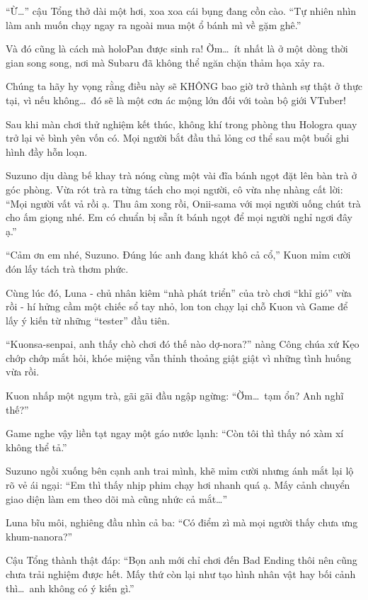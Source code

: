 \documentclass[../main.tex]{subfiles}
\begin{document}
``Ừ\dots'' cậu Tổng thở dài một hơi, xoa xoa cái bụng đang cồn cào. ``Tự nhiên nhìn làm anh muốn chạy ngay ra ngoài mua một ổ bánh mì về gặm ghê.''

Và đó cũng là cách mà holoPan được sinh ra! Ờm\dots\ ít nhất là ở một dòng thời gian song song, nơi mà Subaru đã không thể ngăn chặn thảm họa xảy ra.

Chúng ta hãy hy vọng rằng điều này sẽ KHÔNG bao giờ trở thành sự thật ở thực tại, vì nếu không\dots\ đó sẽ là một cơn ác mộng lớn đối với toàn bộ giới VTuber!

\omk

Sau khi màn chơi thử nghiệm kết thúc, không khí trong phòng thu Hologra quay trở lại vẻ bình yên vốn có. Mọi người bắt đầu thả lỏng cơ thể sau một buổi ghi hình đầy hỗn loạn.

Suzuno dịu dàng bế khay trà nóng cùng một vài đĩa bánh ngọt đặt lên bàn trà ở góc phòng. Vừa rót trà ra từng tách cho mọi người, cô vừa nhẹ nhàng cất lời: ``Mọi người vất vả rồi ạ. Thu âm xong rồi, Onii-sama với mọi người uống chút trà cho ấm giọng nhé. Em có chuẩn bị sẵn ít bánh ngọt để mọi người nghỉ ngơi đây ạ.''

``Cảm ơn em nhé, Suzuno. Đúng lúc anh đang khát khô cả cổ,'' Kuon mỉm cười đón lấy tách trà thơm phức.

Cùng lúc đó, Luna - chủ nhân kiêm ``nhà phát triển'' của trò chơi ``khỉ gió'' vừa rồi - hí hửng cầm một chiếc sổ tay nhỏ, lon ton chạy lại chỗ Kuon và Game để lấy ý kiến từ những ``tester'' đầu tiên.

``Kuonsa-senpai, anh thấy chò chơi đó thế nào dợ-nora?'' nàng Công chúa xứ Kẹo chớp chớp mắt hỏi, khóe miệng vẫn thỉnh thoảng giật giật vì những tình huống vừa rồi.

Kuon nhấp một ngụm trà, gãi gãi đầu ngập ngừng: ``Ờm\dots\ tạm ổn? Anh nghĩ thế?''

Game nghe vậy liền tạt ngay một gáo nước lạnh: ``Còn tôi thì thấy nó xàm xí không thể tả.''

Suzuno ngồi xuống bên cạnh anh trai mình, khẽ mỉm cười nhưng ánh mắt lại lộ rõ vẻ ái ngại: ``Em thì thấy nhịp phim chạy hơi nhanh quá ạ. Mấy cảnh chuyển giao diện làm em theo dõi mà cũng nhức cả mắt\dots''

Luna bĩu môi, nghiêng đầu nhìn cả ba: ``Có điểm zì mà mọi người thấy chưa ưng khum-nanora?''

Cậu Tổng thành thật đáp: ``Bọn anh mới chỉ chơi đến Bad Ending thôi nên cũng chưa trải nghiệm được hết. Mấy thứ còn lại như tạo hình nhân vật hay bối cảnh thì\dots\ anh không có ý kiến gì.''
\end{document}
